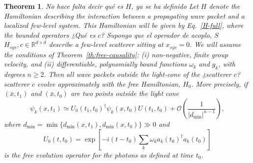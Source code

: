 \documentclass[notitlepage, prx, preprint, amsmath,superscriptaddress,amssymb]{revtex4-1}
\newtheorem{theorem}{Theorem}[section]
\begin{document}
\begin{theorem}\label{th:int_evol}
{\color{red}No hace falta decir qué es $H$, ya se ha definido} Let $H$ denote the Hamiltonian describing the interaction between a propagating wave packet and a localized few-level system. This Hamiltonian will be given by Eq.\ \ref{H-full}, where the bounded operators {\color{red}¿Qué es $c$? Supongo que el operador de acoplo, $S$} $H_{sys},c\in \mathbb{R}^{d\times d}$ describe a few-level scatterer sitting at $x_{sys}=0$. We will assume the conditions of Theorem\ \ref{th:free-causality}: (i) {\color{red}non-negative}, finite group velocity, and (ii) differentiable, polynomially bound functions $\omega_k$ and $g_k$, with degrees $n\geq 2$. Then all wave packets outside the light-cone of the {\color{red}¿scatterer $c$?} scatterer $c$ evolve approximately with the free Hamiltonian, $H_0$. More precisely, if $(\bar x,t_1)$ and $(\bar x,t_0)$ are two points outside the light cone
\begin{equation}
\psi_k(x,t_1) \simeq U_0(t_1,t_0)^\dagger\psi_k(x,t_0)U(t_1,t_0)
+\mathcal{O}\left(\frac{1}{|d_\text{min}|^{n-1}}\right),
\end{equation}
where $d_\text{min} = \min \{d_\text{min}(x,t_1),d_\text{min}(x,t_0)\}\gg 0$ and
\begin{equation}
U_0(t,t_0) = \exp\left[-i(t-t_0)\sum_k\omega_k a_k(t_0)^\dagger a_k(t_0)\right]
\end{equation}
is the free evolution operator for the photons as defined at time $t_0$.
\end{theorem}
\end{document}

